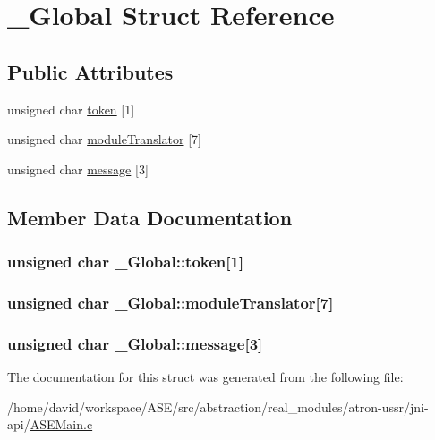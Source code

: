 \hypertarget{struct__Global}{
\section{\_\-Global Struct Reference}
\label{struct__Global}
}
\subsection*{Public Attributes}
\begin{CompactItemize}
\item 
unsigned char \hyperlink{struct__Global_6085a8826cdcc6f6f8d261eff149ac6f}{token} \mbox{[}1\mbox{]}
\item 
unsigned char \hyperlink{struct__Global_913fdedbaef2804f020e6233b87bb045}{moduleTranslator} \mbox{[}7\mbox{]}
\item 
unsigned char \hyperlink{struct__Global_38e922885ff19bcc6ae95cc02d492436}{message} \mbox{[}3\mbox{]}
\end{CompactItemize}


\subsection{Member Data Documentation}
\hypertarget{struct__Global_6085a8826cdcc6f6f8d261eff149ac6f}{
\subsubsection{\setlength{\rightskip}{0pt plus 5cm}unsigned char {\bf \_\-Global::token}\mbox{[}1\mbox{]}}}
\label{struct__Global_6085a8826cdcc6f6f8d261eff149ac6f}


\hypertarget{struct__Global_913fdedbaef2804f020e6233b87bb045}{
\subsubsection{\setlength{\rightskip}{0pt plus 5cm}unsigned char {\bf \_\-Global::moduleTranslator}\mbox{[}7\mbox{]}}}
\label{struct__Global_913fdedbaef2804f020e6233b87bb045}


\hypertarget{struct__Global_38e922885ff19bcc6ae95cc02d492436}{
\subsubsection{\setlength{\rightskip}{0pt plus 5cm}unsigned char {\bf \_\-Global::message}\mbox{[}3\mbox{]}}}
\label{struct__Global_38e922885ff19bcc6ae95cc02d492436}




The documentation for this struct was generated from the following file:\begin{CompactItemize}
\item 
/home/david/workspace/ASE/src/abstraction/real\_\-modules/atron-ussr/jni-api/\hyperlink{ASEMain_8c}{ASEMain.c}\end{CompactItemize}
